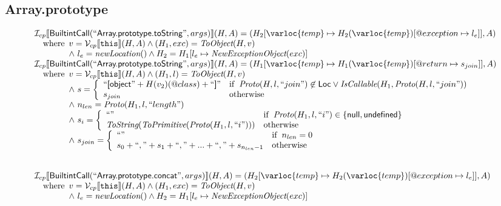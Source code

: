 \subsection{Array.prototype}
\[
\begin{array}{l}

\I _{cp}\lbr \SF{BuiltintCall}(``\SF{Array.prototype.toString}",args)\rbr(H,A)
 = (H_2[\varloc{temp}\mapsto H_2(\varloc{temp})[\varprop{exception}\mapsto l_e]], A) \\
\quad\wherec{
  v = \V _{cp}\lbr \TT{this}\rbr (H,A) \land (H_1,exc) = \hf{ToObject}(H,v)\\
  \land\ l_e = \hf{newLocation}() \land H_2=H_1[l_e\mapsto\hf{NewExceptionObject}(exc)] 
  }\\

\I _{cp}\lbr \SF{BuiltintCall}(``\SF{Array.prototype.toString}",args)\rbr(H,A)
 = (H_1[\varloc{temp}\mapsto H_1(\varloc{temp})[\varprop{return}\mapsto s_{join}]], A) \\
\quad\wherec{
  v = \V _{cp}\lbr \TT{this}\rbr (H,A) \land (H_1,l) = \hf{ToObject}(H,v)\\
  \land\ s = \left\{
    \begin{array}{ll}
      ``\SF{[object}" + H(v_2)(@class) + ``\SF{]}"
      & \ifc{\hf{Proto}(H,l,``join") \not\in \SF{Loc} \lor \hf{IsCallable}(H_1,\hf{Proto}(H,l,``join"))}\\
      s_{join} & \owc
    \end{array}
    \right.\\
  \land\ n_{len} = \hf{Proto}(H_1, l, ``length")\\
  \land\ s_i = \left\{\begin{array}{ll}
      ``" & \ifc{\hf{Proto}(H_1, l, ``i") \in \{ \SF{null}, \SF{undefined}\}}\\
      \hf{ToString}(\hf{ToPrimitive}(\hf{Proto}(H_1, l, ``i"))) & \owc
    \end{array}\right.\\
  \land\ s_{join} = \left\{\begin{array}{ll}
    ``" & \ifc{n_{len} = 0}\\
    s_0 + ``," + s_1 + ``," + ... + ``," + s_{n_{len}-1} & \owc
    \end{array}\right.\\
  }\\
\\\\


\I _{cp}\lbr \SF{BuiltintCall}(``\SF{Array.prototype.concat}",args)\rbr(H,A)
 = (H_2[\varloc{temp}\mapsto H_2(\varloc{temp})[\varprop{exception}\mapsto l_e]], A) \\
\quad\wherec{
  v = \V _{cp}\lbr \TT{this}\rbr (H,A) \land (H_1,exc) = \hf{ToObject}(H,v)\\
  \land\ l_e = \hf{newLocation}() \land H_2=H_1[l_e\mapsto\hf{NewExceptionObject}(exc)] 
  }\\
   

\end{array}\]
